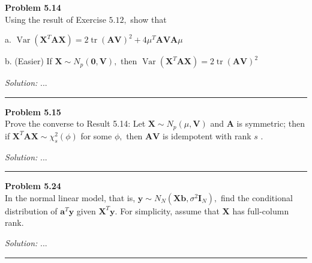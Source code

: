 \documentclass[a4paper, 11pt]{article}
\newenvironment{problem}[2][Problem]
    { \begin{mdframed}[backgroundcolor=gray!20] \textbf{#1 #2} \\}
    {  \end{mdframed}}
\newenvironment{solution}
    {\textit{Solution:}}
    {}
\begin{document}
\begin{problem}{5.14}
Using the result of Exercise $5.12,$ show that

a. $\operatorname{Var}\left(\mathbf{X}^{T} \mathbf{A X}\right)=2 \operatorname{tr}(\mathbf{A V})^{2}+4 \mu^{T} \mathbf{A V A} \mu$

b. (Easier) If $\mathbf{X} \sim N_{p}(\mathbf{0}, \mathbf{V}),$ then $\operatorname{Var}\left(\mathbf{X}^{T} \mathbf{A} \mathbf{X}\right)=2 \operatorname{tr}(\mathbf{A} \mathbf{V})^{2}$
\end{problem}
\begin{solution}
...
\end{solution}

\noindent\rule{7in}{2.8pt}

\begin{problem}{5.15}
Prove the converse to Result 5.14: Let $\mathbf{X} \sim N_{p}(\mu, \mathbf{V})$ and $\mathbf{A}$ is symmetric; then if $\mathbf{X}^{T} \mathbf{A} \mathbf{X} \sim \chi_{s}^{2}(\phi)$ for some $\phi,$ then $\mathbf{A V}$ is idempotent with rank $s$ .
\end{problem}
\begin{solution}
...
\end{solution}

\noindent\rule{7in}{2.8pt}

\begin{problem}{5.24}
In the normal linear model, that is, $\mathbf{y} \sim N_{N}\left(\mathbf{X b}, \sigma^{2} \mathbf{I}_{N}\right),$ find the conditional distribution of $\mathbf{a}^{T} \mathbf{y}$ given $\mathbf{X}^{T} \mathbf{y} .$ For simplicity, assume that $\mathbf{X}$ has full-column rank.
\end{problem}
\begin{solution}
...
\end{solution}

\noindent\rule{7in}{2.8pt}
\end{document}
